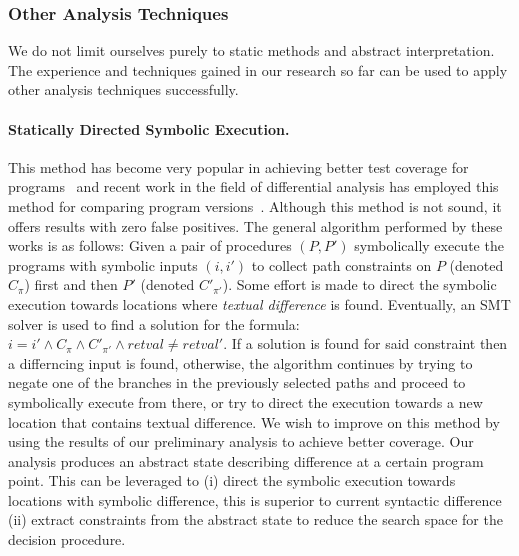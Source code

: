 \subsubsection{Other Analysis Techniques}
We do not limit ourselves purely to static methods and abstract interpretation. The experience and techniques gained in our research so far can be used to apply other analysis techniques successfully.

\paragraph{Statically Directed Symbolic Execution.} This method has become very popular in achieving better test coverage for programs~\cite{GodefroidKlarlundSen05} and recent work in the field of differential analysis has employed this method for comparing program versions~\cite{DwyerElbaumPerson08}. Although this method is not sound, it offers results with zero false positives. The general algorithm performed by these works is as follows: Given a pair of procedures $(P,P')$ symbolically execute the programs with symbolic inputs $(i,i')$ to collect path constraints on $P$ (denoted $C_{\pi}$) first and then $P'$ (denoted $C'_{\pi'}$). Some effort is made to direct the symbolic execution towards locations where \emph{textual difference} is found. Eventually, an SMT solver is used to find a solution for the formula: $i = i' \wedge C_{\pi} \wedge C'_{\pi'} \wedge retval \neq retval'$. If a solution is found for said constraint then a differncing input is found, otherwise, the algorithm continues by trying to negate one of the branches in the previously selected paths and proceed to symbolically execute from there, or try to direct the execution towards a new location that contains textual difference. We wish to improve on this method by using the results of our preliminary analysis to achieve better coverage. Our analysis produces an abstract state describing difference at a certain program point. This can be leveraged to (i) direct the symbolic execution towards locations with symbolic difference, this is superior to current syntactic difference (ii) extract constraints from the abstract state to reduce the search space for the decision procedure. 

